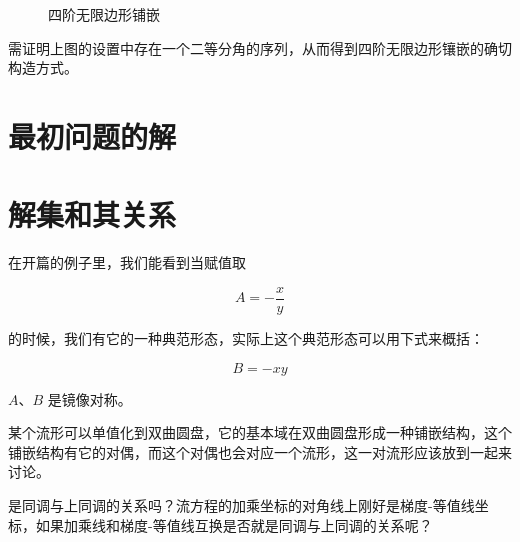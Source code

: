 \documentclass[a4paper,12pt]{article}
\numberwithin{definition}{section}
\numberwithin{lemma}{section}
\numberwithin{proposition}{section}
\numberwithin{theorem}{section}
\numberwithin{grammar}{section}
\numberwithin{program}{section}
\numberwithin{convention}{section}
\numberwithin{corollary}{section}
\begin{document}
\begin{figure}[ht]
    \centering
    \caption{四阶无限边形铺嵌}\label{fig:apeirogon}
\end{figure}

需证明上图的设置中存在一个二等分角的序列，从而得到四阶无限边形镶嵌的确切构造方式。

\newpage

\section{最初问题的解}


\newpage

\section{解集和其关系}

在开篇的例子里，我们能看到当赋值取

$$
A = - \frac{x}{y}
$$

的时候，我们有它的一种典范形态，实际上这个典范形态可以用下式来概括：

$$
B = - xy
$$


$A$、$B$ 是镜像对称。

某个流形可以单值化到双曲圆盘，它的基本域在双曲圆盘形成一种铺嵌结构，这个铺嵌结构有它的对偶，而这个对偶也会对应一个流形，这一对流形应该放到一起来讨论。

是同调与上同调的关系吗？流方程的加乘坐标的对角线上刚好是梯度-等值线坐标，如果加乘线和梯度-等值线互换是否就是同调与上同调的关系呢？
\end{document}

